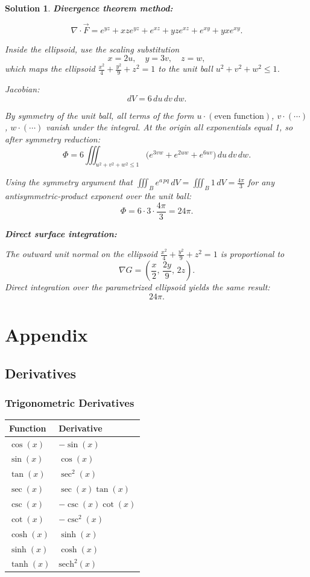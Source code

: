 \documentclass{article}
\newtheorem{solution}{Solution}
\begin{document}
\begin{solution}

\textbf{Divergence theorem method:}

\[
\nabla\cdot \vec{F}
= e^{yz} + xze^{yz} + e^{xz} + yze^{xz} + e^{xy} + yxe^{xy}.
\]

Inside the ellipsoid, use the scaling substitution
\[
x = 2u,\quad y = 3v,\quad z = w,
\]
which maps the ellipsoid $\frac{x^2}{4} + \frac{y^2}{9} + z^2 = 1$ to the unit ball $u^2 + v^2 + w^2 \leq 1$.

Jacobian:
\[
dV = 6\, du\, dv\, dw.
\]

By symmetry of the unit ball, all terms of the form $u \cdot (\text{even function})$, $v\cdot(\cdots)$, $w\cdot(\cdots)$ vanish under the integral. At the origin all exponentials equal 1, so after symmetry reduction:
\[
\Phi = 6\iiint_{u^2+v^2+w^2\leq 1} \bigl(e^{3vw} + e^{2uw} + e^{6uv}\bigr)\, du\,dv\,dw.
\]

Using the symmetry argument that $\iiint_B e^{a\,pq}\,dV = \iiint_B 1\,dV = \frac{4\pi}{3}$ for any antisymmetric-product exponent over the unit ball:
\[
\Phi = 6 \cdot 3 \cdot \frac{4\pi}{3} = \boxed{24\pi}.
\]

\textbf{Direct surface integration:}

The outward unit normal on the ellipsoid $\frac{x^2}{4}+\frac{y^2}{9}+z^2=1$ is proportional to
\[
\nabla G = \left(\frac{x}{2},\, \frac{2y}{9},\, 2z\right).
\]
Direct integration over the parametrized ellipsoid yields the same result:
\[
\boxed{24\pi}.
\]

\end{solution}

\section{Appendix}
\subsection{Derivatives}
\label{Derivatives}
\subsubsection{Trigonometric Derivatives}
\begin{tabular}{ll}
\hline
Function & Derivative \\
\hline
\(\cos(x)\) & \(-\sin(x)\) \\
\(\sin(x)\) & \(\cos(x)\) \\
\(\tan(x)\) & \(\sec^{2}(x)\) \\
\(\sec(x)\) & \(\sec(x)\tan(x)\) \\
\(\csc(x)\) & \(-\csc(x)\cot(x)\) \\
\(\cot(x)\) & \(-\csc^{2}(x)\) \\
\(\cosh(x)\) & \(\sinh(x)\) \\
\(\sinh(x)\) & \(\cosh(x)\) \\
\(\tanh(x)\) & \(\text{sech}^{2}(x)\) \\
\hline
\end{tabular}
\end{document}
